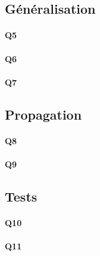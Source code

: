\documentclass[12pt]{article}
\begin{document}
		\subsection{Généralisation}
		
			\paragraph{Q5}
			\paragraph{Q6}
			\paragraph{Q7}
		
		\subsection{Propagation}
				
			
			\paragraph{Q8}
			\paragraph{Q9}
			
		\subsection{Tests}
			
			\paragraph{Q10}
			\paragraph{Q11}
						
\end{document}
